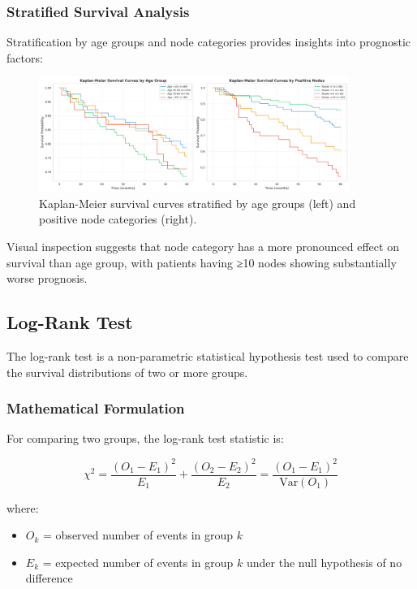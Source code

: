 \documentclass[12pt,a4paper]{article}
\begin{document}
\subsubsection{Stratified Survival Analysis}

Stratification by age groups and node categories provides insights into prognostic factors:

\begin{figure}[H]
\centering
\includegraphics[width=0.9\textwidth]{kaplan_meier_stratified.png}
\caption{Kaplan-Meier survival curves stratified by age groups (left) and positive node categories (right).}
\label{fig:km_stratified}
\end{figure}

Visual inspection suggests that node category has a more pronounced effect on survival than age group, with patients having ≥10 nodes showing substantially worse prognosis.

\subsection{Log-Rank Test}

The log-rank test is a non-parametric statistical hypothesis test used to compare the survival distributions of two or more groups.

\subsubsection{Mathematical Formulation}

For comparing two groups, the log-rank test statistic is:

\begin{equation}
\chi^2 = \frac{(O_1 - E_1)^2}{E_1} + \frac{(O_2 - E_2)^2}{E_2} = \frac{(O_1 - E_1)^2}{\text{Var}(O_1)}
\label{eq:logrank}
\end{equation}

where:
\begin{itemize}
    \item \(O_k\) = observed number of events in group \(k\)
    \item \(E_k\) = expected number of events in group \(k\) under the null hypothesis of no difference
\end{itemize}
\end{document}
